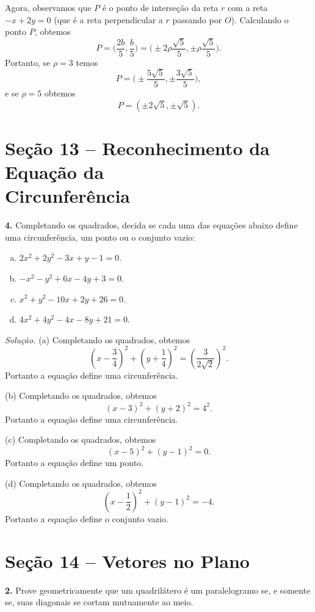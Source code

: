 \documentclass[a4paper,11pt]{article}
\begin{document}
Agora, observamos que $P$ é o ponto de interseção da reta $r$ com a reta $-x + 2y = 0$ (que é a reta perpendicular a $r$ passando por $O$).
Calculando o ponto $P$, obtemos
\[
  P = \Big( \frac{2b}{5}, \frac{b}{5} \Big) = \Big( \pm 2\rho \frac{\sqrt{5}}{5}, \pm \rho \frac{\sqrt{5}}{5} \Big).
\]
Portanto, se $\rho = 3$ temos
\[
  P = \Big( \pm \frac{5 \sqrt{5}}{5}, \pm \frac{3\sqrt{5}}{5} \Big),
\]
e se $\rho = 5$ obtemos
\[
  P = ( \pm 2\sqrt{5}, \pm \sqrt{5}).
\]

\section*{Seção 13 -- Reconhecimento da Equação da\\Circunferência}

\textbf{4.}
Completando os quadrados, decida se cada uma das equações abaixo define uma circunferência, um ponto ou o conjunto vazio:
\begin{enumerate}[(a)]
  \item
    $2x^2 + 2y^2 - 3x + y - 1 = 0$.
  \item
    $-x^2 - y^2 + 6x - 4y + 3 = 0$.
  \item
    $x^2 + y^2 - 10x + 2y + 26 = 0$.
  \item
    $4x^2 + 4y^2 - 4x - 8y + 21 = 0$.
\end{enumerate}

\vspace{\baselineskip}

\emph{Solução.}
(a)
Completando os quadrados, obtemos
\[
  \left( x - \frac{3}{4} \right)^2 + \left( y + \frac{1}{4} \right)^2 = \left( \frac{3}{2\sqrt{2}} \right)^2.
\]
Portanto a equação define uma circunferência.

(b)
Completando os quadrados, obtemos
\[
  (x-3)^2 + (y+2)^2 = 4^2.
\]
Portanto a equação define uma circunferência.

(c)
Completando os quadrados, obtemos
\[
  (x-5)^2 + (y-1)^2 = 0.
\]
Portanto a equação define um ponto.

(d)
Completando os quadrados, obtemos
\[
  \left( x - \frac{1}{2} \right)^2 + (y - 1)^2 = -4.
\]
Portanto a equação define o conjunto vazio.

\section*{Seção 14 -- Vetores no Plano}

\textbf{2.}
Prove geometricamente que um quadrilátero é um paralelogramo se, e somente se, suas diagonais se cortam mutuamente ao meio.
\end{document}
